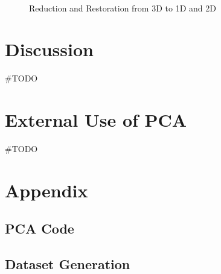 \documentclass{article}
\begin{document}
		\begin{figure}[!htbp]
			\centering
			\caption{Reduction and Restoration from 3D to 1D and 2D}
			\subfloat[Reduced to 1D]{\resizebox{0.48\linewidth}{!}{}}
			\subfloat[Reduced to 2D]{\resizebox{0.48\linewidth}{!}{}} \\
		\end{figure}

	\section{Discussion}
		\#TODO

	\section{External Use of PCA}
		\#TODO

	\nocite{*}
	\printbibliography{}

	\appendix
	\section{Appendix}
	\setcounter{secnumdepth}{2}
	\renewcommand{\thesubsection}{\Alph{subsection}}
	\subsection{PCA Code}
	
	\subsection{Dataset Generation}
	
\end{document}
